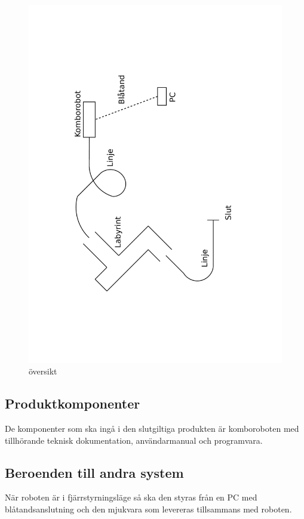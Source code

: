 \documentclass[a4paper,12pt]{article}
\begin{document}
\begin{figure}[h!]
	\caption{översikt}
	\begin{center}
		\includegraphics[scale=0.5,angle=270]{Oversikt.pdf}
	\end{center}
\end{figure}

\subsection{Produktkomponenter}
De komponenter som ska ingå i den slutgiltiga produkten är
komboroboten med tillhörande teknisk dokumentation, användarmanual och programvara.

\subsection{Beroenden till andra system}
När roboten är i fjärrstyrningsläge så ska den styras från en PC 
med blåtandsanslutning och den mjukvara som levereras tillsammans med roboten.
\end{document}

